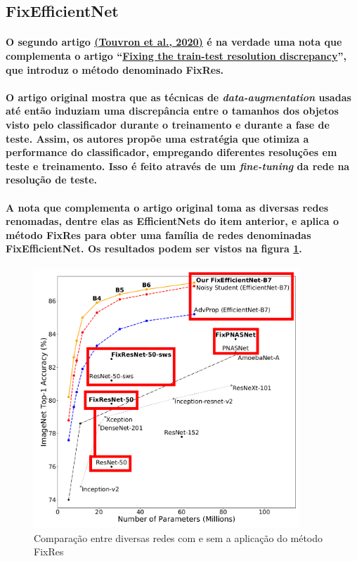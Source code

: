 \documentclass[a4paper]{article}    %
\begin{document}
\subsection{FixEfficientNet}
\paragraph{O segundo artigo \href{https://arxiv.org/pdf/2003.08237.pdf}{(Touvron et al., 2020)} é na verdade uma nota que complementa o artigo ``\href{https://arxiv.org/pdf/1906.06423.pdf}{Fixing the train-test resolution discrepancy}'', que introduz o método denominado FixRes.}

\paragraph{O artigo original mostra que as técnicas de \emph{data-augmentation} usadas até então induziam uma discrepância entre o tamanhos dos objetos visto pelo classificador durante o treinamento e durante a fase de teste. Assim, os autores propõe uma estratégia que otimiza a performance do classificador, empregando diferentes resoluções em teste e treinamento. Isso é feito através de um \emph{fine-tuning} da rede na resolução de teste.}

\paragraph{A nota que complementa o artigo original toma as diversas redes renomadas, dentre elas as EfficientNets do item anterior, e aplica o método FixRes para obter uma família de redes denominadas FixEfficientNet. Os resultados podem ser vistos na figura \ref{fig:q10}.}

\begin{figure}[H]
    \centering
    \includegraphics[width=10cm]{Q10_FixEfficientNet}
    \caption{Comparação entre diversas redes com e sem a aplicação do método FixRes}
    \label{fig:q10}
\end{figure}
\end{document}
